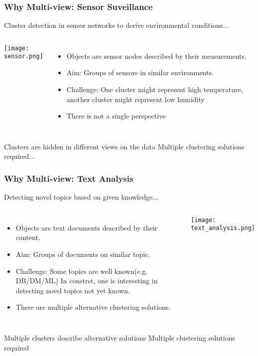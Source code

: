 \documentclass{beamer}
\begin{document}
\begin{frame}
\frametitle{Why Multi-view: Sensor Suveillance}
Cluster detection in sensor networks to derive environmental conditions...
	\begin{columns}
		\texttt{[image: sensor.png]}
	\begin{itemize}
		\item{Objects are sensor nodes described by their measurements.}
		\item{Aim: Groups of sensors in similar environments.}
		\item{Challenge: One cluster might represent high temperature, another cluster might represent low humidity}
		\item{There is not a single perspective}
	\end{itemize}
	\end{columns}
\begin{block}{Clusters are hidden in different views on the data}
Multiple clustering solutions required...
\end{block}
\end{frame}

\begin{frame}
\frametitle{Why Multi-view: Text Analysis}
Detecting novel topics based on given knowledge...
	\begin{columns}
	\column{.65\textwidth}
	\begin{itemize}
		\item{Objects are text documents described by their content.}
		\item{Aim: Groups of documents on similar topic.}
		\item{Challenge: Some topics are well known(e.g. DB/DM/ML) In constrst, one is interesting in detecting novel topics not yet known.}
		\item{There are multiple alternative clustering solutions.}
	\end{itemize}
	\column{.35\textwidth}
		\texttt{[image: text\_analysis.png]}
	\end{columns}
\begin{block}{Multiple clusters describe alternative solutions}
Multiple clustering solutions required
\end{block}
\end{frame}
\end{document}
